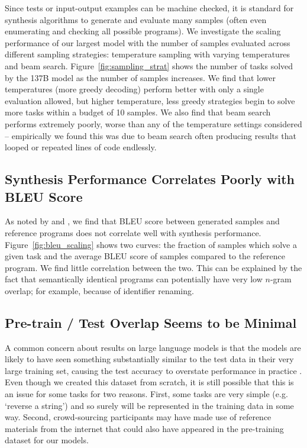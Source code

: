 Since tests or input-output examples can be machine checked, it is standard \citep{ROBUSTFILL} for synthesis algorithms to generate and evaluate many samples (often even enumerating and checking all possible programs). We investigate the scaling performance of our largest model with the number of samples evaluated across different sampling strategies: temperature sampling with varying temperatures and beam search. Figure~\ref{fig:sampling_strat} shows the number of tasks solved by the 137B model as the number of samples increases. We find that lower temperatures (more greedy decoding) perform better with only a single evaluation allowed, but higher temperature, less greedy strategies begin to solve more tasks within a budget of 10 samples. We also find that beam search performs extremely poorly, worse than any of the temperature settings considered – empirically we found this was due to beam search often producing results that looped or repeated lines of code endlessly.

\subsection{Synthesis Performance Correlates Poorly with BLEU Score}
\label{sec:bleu}

As noted by \cite{apps} and \cite{codex}, we find that BLEU score between generated samples and reference programs does not correlate well with synthesis performance. Figure~\ref{fig:bleu_scaling} shows two curves: the fraction of samples which solve a given task and the average BLEU score of samples compared to the reference program. We find little correlation between the two. This can be explained by the fact that semantically identical programs can potentially have very low $n$-gram overlap; for example, because of identifier renaming.

\subsection{Pre-train / Test Overlap Seems to be Minimal}
\label{sec:memorization}

A common concern about results on large language models is that the models are likely to have seen something substantially similar to the test data in their very large training set, causing the test accuracy to overstate performance in practice \citep{GPT3}. Even though we created this dataset from scratch, it is still possible that this is an issue for some tasks for two reasons. First, some tasks are very simple (e.g. `reverse a string') and so surely will be represented in the training data in some way. Second, crowd-sourcing participants may have made use of reference materials from the internet that could also have appeared in the pre-training dataset for our models.

